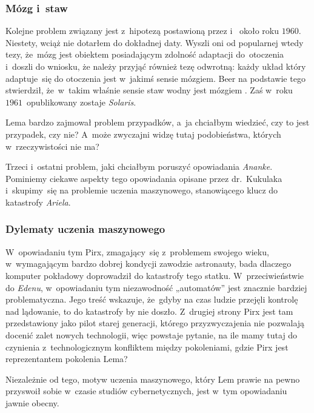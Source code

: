 \documentclass[10pt,t]{beamer}
\begin{document}
\begin{frame}
  \frametitle{Mózg i~staw}


  Kolejne problem związany jest z~hipotezą postawioną przez
  i~
  około roku $1960$. Niestety, wciąż nie dotarłem do dokładnej daty.
  Wyszli oni od popularnej wtedy tezy, że~mózg jest obiektem posiadającym
  zdolność adaptacji do~otoczenia i~doszli do wniosku, że należy przyjąć
  również tezę odwrotną: każdy układ który adaptuje~się do otoczenia jest
  w~jakimś sensie mózgiem. Beer na podstawie tego stwierdził, że~w~takim
  właśnie sensie staw wodny jest mózgiem
  \parencite{Pickering-Cybernetics-in-Britain-Ver-2022}. Zaś w~roku
  $1961$~opublikowany zostaje \textit{Solaris}.

  Lema bardzo zajmował problem przypadków, a~ja chciałbym wiedzieć, czy to
  jest przypadek, czy nie? A~może zwyczajni widzę tutaj podobieństwa,
  których w~rzeczywistości nie ma?

  Trzeci i~ostatni problem, jaki chciałbym poruszyć opowiadania
  \textit{Ananke}. Pominiemy ciekawe aspekty tego opowiadania opisane
  przez dr.~Kukulaka i~skupimy~się na problemie uczenia maszynowego,
  stanowiącego klucz do katastrofy \textit{Ariela}.

\end{frame}





\begin{frame}
  \frametitle{Dylematy uczenia maszynowego}


  W~opowiadaniu tym Pirx, zmagający~się z~problemem swojego wieku,
  w~wymagającym bardzo dobrej kondycji zawodzie astronauty, bada
  dlaczego komputer pokładowy doprowadził do katastrofy tego statku.
  W~przeciwieństwie do \textit{Edenu}, w~opowiadaniu tym niezawodność
  „automatów” jest znacznie bardziej problematyczna. Jego treść
  wskazuje, że~gdyby na czas ludzie przejęli kontrolę nad lądowanie, to do
  katastrofy by nie doszło. Z~drugiej strony Pirx jest tam przedstawiony
  jako pilot starej generacji, którego przyzwyczajenia nie pozwalają
  docenić zalet nowych technologii, więc powstaje pytanie, na ile mamy
  tutaj do czynienia z~technologicznym konfliktem między pokoleniami,
  gdzie Pirx jest reprezentantem pokolenia Lema?

  Niezależnie od tego, motyw uczenia maszynowego, który Lem prawie na pewno
  przyswoił sobie w~czasie studiów cybernetycznych, jest w~tym opowiadaniu
  jawnie obecny.

\end{frame}
\end{document}
